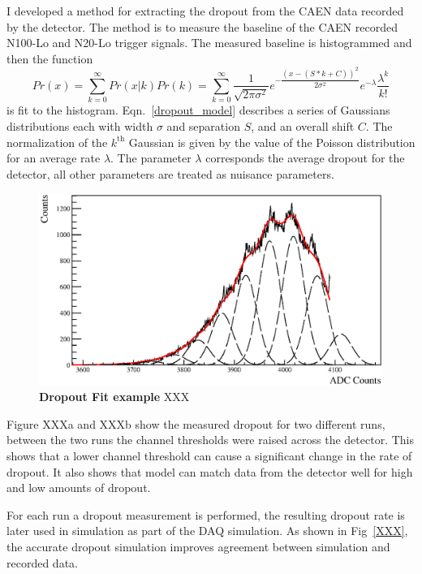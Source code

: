 I developed a method for extracting the dropout from the CAEN data
recorded by the detector.
The method is to measure the baseline of the CAEN recorded N100-Lo and N20-Lo
trigger signals.
The measured baseline is histogrammed and then the function
\begin{equation}
    Pr(x) = \sum_{k=0}^{\infty} Pr(x | k)Pr(k) = \sum_{k=0}^{\infty} \dfrac{1}{\sqrt{2 \pi \sigma^2}} e^{-\dfrac{(x - (S*k + C))^2}{2 \sigma^2}} e^{-\lambda}\dfrac{\lambda^{k}}{k!}
    \label{dropout_model}
\end{equation}
is fit to the histogram. Eqn.~\ref{dropout_model} describes a series of Gaussians
distributions each with width $\sigma$ and separation $S$, and an overall shift $C$.
The normalization of the $k^{\text{th}}$ Gaussian is given by the value of the Poisson
distribution for an average rate $\lambda$.
The parameter $\lambda$ corresponds the average dropout for the detector, all
other parameters are treated as nuisance parameters.

\begin{figure}[htbp]
    \centering
    \includegraphics[width=1\textwidth]{dropout_example}
    \caption[Dropout Fit example]{\textbf{Dropout Fit example} XXX}
\label{fig:dropoutexample}
\end{figure}
Figure XXXa and XXXb show the measured dropout for two different runs, between
the two runs the channel thresholds were raised across the detector. This shows
that a lower channel threshold can cause a significant change in the rate of
dropout. It also shows that model can match data from the detector well for high
and low amounts of dropout.

For each run a dropout measurement is performed, the resulting dropout rate
is later used in simulation as part of the DAQ simulation.
As shown in Fig~\ref{XXX}, the accurate dropout simulation improves agreement between simulation and recorded
data.


